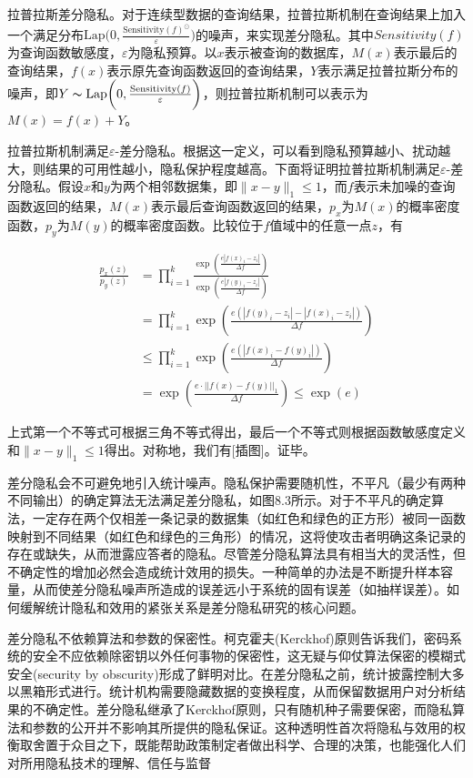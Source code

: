 拉普拉斯差分隐私。对于连续型数据的查询结果，拉普拉斯机制在查询结果上加入一个满足分布$\text{Lap}\bigg(0,\frac{\text{Sensitivity}(f)^{\odot}}{\varepsilon}\bigg)$的噪声，来实现差分隐私。其中$Sensitivity(f)$为查询函数敏感度，$\varepsilon$为隐私预算。以$x$表示被查询的数据库，$M(x)$表示最后的查询结果，$f(x)$表示原先查询函数返回的查询结果，$Y$表示满足拉普拉斯分布的噪声，即$Y\thicksim\text{Lap}\bigg(0,\frac{\text{Sensitivity}(f)}{\varepsilon}\bigg)$，则拉普拉斯机制可以表示为$M(x)=f(x)+Y$。

拉普拉斯机制满足$\varepsilon$-差分隐私。根据这一定义，可以看到隐私预算越小、扰动越大，则结果的可用性越小，隐私保护程度越高。下面将证明拉普拉斯机制满足$\varepsilon $-差分隐私。假设$x$和$y$为两个相邻数据集，即$\parallel x - y \parallel_1 \le 1$，而$f$表示未加噪的查询函数返回的结果，$M(x)$表示最后查询函数返回的结果，$p_x$为$M(x)$的概率密度函数，$p_y$为$M(y)$的概率密度函数。比较位于$f$值域中的任意一点$z$，有

\begin{equation}
\begin{aligned}
\frac{p_x(z)}{p_y(z)} &= \prod_{i=1}^{k} \frac{\exp\left(\frac{e|f(x)_i - z_i|}{\Delta f}\right)}{\exp\left(\frac{e|f(y)_i - z_i|}{\Delta f}\right)} \\
&= \prod_{i=1}^{k} \exp\left(\frac{e(|f(y)_i - z_i| - |f(x)_i - z_i|)}{\Delta f}\right) \\
& \leq \prod_{i=1}^{k} \exp\left(\frac{e(|f(x)_i - f(y)_i|)}{\Delta f}\right) \\
&= \exp\left(\frac{e \cdot ||f(x) - f(y)||_1 }{ {\Delta f}}\right)
\leq \exp(e)
\end{aligned}
\end{equation}

上式第一个不等式可根据三角不等式得出，最后一个不等式则根据函数敏感度定义和$\parallel x - y \parallel_1 \le 1$得出。对称地，我们有[插图]。证毕。

差分隐私会不可避免地引入统计噪声。隐私保护需要随机性，不平凡（最少有两种不同输出）的确定算法无法满足差分隐私，如图8.3所示。对于不平凡的确定算法，一定存在两个仅相差一条记录的数据集（如红色和绿色的正方形）被同一函数映射到不同结果（如红色和绿色的三角形）的情况，这将使攻击者明确这条记录的存在或缺失，从而泄露应答者的隐私。尽管差分隐私算法具有相当大的灵活性，但不确定性的增加必然会造成统计效用的损失。一种简单的办法是不断提升样本容量，从而使差分隐私噪声所造成的误差远小于系统的固有误差（如抽样误差）。如何缓解统计隐私和效用的紧张关系是差分隐私研究的核心问题。

差分隐私不依赖算法和参数的保密性。柯克霍夫(Kerckhof)原则告诉我们，密码系统的安全不应依赖除密钥以外任何事物的保密性，这无疑与仰仗算法保密的模糊式安全(security by obscurity)形成了鲜明对比。在差分隐私之前，统计披露控制大多以黑箱形式进行。统计机构需要隐藏数据的变换程度，从而保留数据用户对分析结果的不确定性。差分隐私继承了Kerckhof原则，只有随机种子需要保密，而隐私算法和参数的公开并不影响其所提供的隐私保证。这种透明性首次将隐私与效用的权衡取舍置于众目之下，既能帮助政策制定者做出科学、合理的决策，也能强化人们对所用隐私技术的理解、信任与监督

